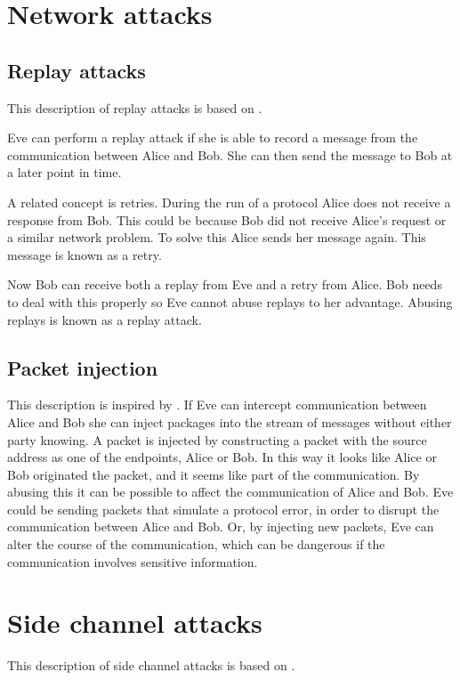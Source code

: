 \section{Network attacks}\label{attacks}


\subsection{Replay attacks}\label{replay_attack}
This description of replay attacks is based on \citet[p.~223]{cryptoenginering}.

Eve can perform a replay attack if she is able to record a message from the communication between Alice and Bob.
She can then send the message to Bob at a later point in time. 

A related concept is retries.
During the run of a protocol Alice does not receive a response from Bob.
This could be because Bob did not receive Alice's request or a similar network problem.
To solve this Alice sends her message again.
This message is known as a retry.

Now Bob can receive both a replay from Eve and a retry from Alice.
Bob needs to deal with this properly so Eve cannot abuse replays to her advantage.
Abusing replays is known as a replay attack.

\subsection{Packet injection}
This description is inspired by \cite{packetinjection}.
If Eve can intercept communication between Alice and Bob she can inject packages into the stream of messages without either party knowing.
A packet is injected by constructing a packet with the source address as one of the endpoints, Alice or Bob.
In this way it looks like Alice or Bob originated the packet, and it seems like part of the communication.
By abusing this it can be possible to affect the communication of Alice and Bob.
Eve could be sending packets that simulate a protocol error, in order to disrupt the communication between Alice and Bob.
Or, by injecting new packets, Eve can alter the course of the communication, which can be dangerous if the communication involves sensitive information.

\section{Side channel attacks}
This description of side channel attacks is based on \citet[p.~132]{cryptoenginering}.

